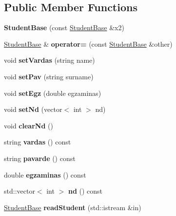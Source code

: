 \subsection*{Public Member Functions}
\begin{DoxyCompactItemize}
\item 
\mbox{\label{class_student_base_aa03be154c85a6ed0a4b946a8af9be7f7}} 
{\bfseries Student\+Base} (const \mbox{\hyperlink{class_student_base}{Student\+Base}} \&x2)
\item 
\mbox{\label{class_student_base_a33492cade3cb6912b66b0aaac26ca0bc}} 
\mbox{\hyperlink{class_student_base}{Student\+Base}} \& {\bfseries operator=} (const \mbox{\hyperlink{class_student_base}{Student\+Base}} \&other)
\item 
\mbox{\label{class_student_base_ad3d2ec87d8481a846d06fbdaae88aec1}} 
void {\bfseries set\+Vardas} (string name)
\item 
\mbox{\label{class_student_base_a640675f1b05262dd1acaa798c2259675}} 
void {\bfseries set\+Pav} (string surname)
\item 
\mbox{\label{class_student_base_a62a8e545c6f0a53d1af6508856bbf670}} 
void {\bfseries set\+Egz} (double egzaminas)
\item 
\mbox{\label{class_student_base_abca77bf7b90c9c6ad94975cbbb34979d}} 
void {\bfseries set\+Nd} (vector$<$ int $>$ nd)
\item 
\mbox{\label{class_student_base_a3776b744979f4f34968ef407503f44a8}} 
void {\bfseries clear\+Nd} ()
\item 
\mbox{\label{class_student_base_a6fe791399496f3b4b0c9d910472b2232}} 
string {\bfseries vardas} () const
\item 
\mbox{\label{class_student_base_adc52417e044a31212359ea106fe81236}} 
string {\bfseries pavarde} () const
\item 
\mbox{\label{class_student_base_a250eda1d2180e7d61ca3f3930417cf06}} 
double {\bfseries egzaminas} () const
\item 
\mbox{\label{class_student_base_aff680a22b1f9240273612335b94f58c4}} 
std\+::vector$<$ int $>$ {\bfseries nd} () const
\item 
\mbox{\label{class_student_base_a697cb5bf22e2e43772c9b52a32d4b7f2}} 
\mbox{\hyperlink{class_student_base}{Student\+Base}} {\bfseries read\+Student} (std\+::istream \&in)
\end{DoxyCompactItemize}
